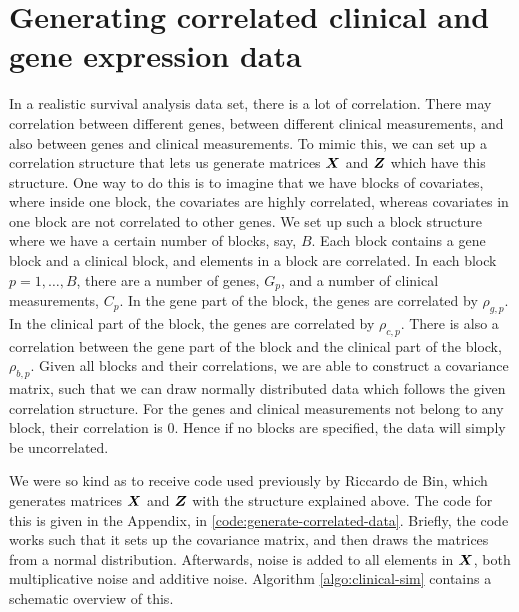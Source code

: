 \section{Generating correlated clinical and gene expression data}
\label{sec:generating-correlated-data}
In a realistic survival analysis data set, there is a lot of correlation.
There may correlation between different genes, between different clinical measurements, and also between genes and clinical measurements.
To mimic this, we can set up a correlation structure that lets us generate matrices $\bm{X}$ and $\bm{Z}$ which have this structure.
One way to do this is to imagine that we have blocks of covariates, where inside one block, the covariates are highly correlated, whereas covariates in one block are not correlated to other genes.
We set up such a block structure where we have a certain number of blocks, say, $B$.
Each block contains a gene block and a clinical block, and elements in a block are correlated.
In each block $p=1,\ldots,B$, there are a number of genes, $G_p$, and a number of clinical measurements, $C_p$.
In the gene part of the block, the genes are correlated by $\rho_{g,p}$.
In the clinical part of the block, the genes are correlated by $\rho_{c,p}$.
There is also a correlation between the gene part of the block and the clinical part of the block, $\rho_{b,p}$.
Given all blocks and their correlations, we are able to construct a covariance matrix, such that we can draw normally distributed data which follows the given correlation structure.
For the genes and clinical measurements not belong to any block, their correlation is 0.
Hence if no blocks are specified, the data will simply be uncorrelated.

We were so kind as to receive code used previously by Riccardo de Bin, which generates matrices $\bm{X}$ and $\bm{Z}$ with the structure explained above.
The code for this is given in the Appendix, in \ref{code:generate-correlated-data}.
Briefly, the code works such that it sets up the covariance matrix, and then draws the matrices from a normal distribution.
Afterwards, noise is added to all elements in $\bm{X}$, both multiplicative noise and additive noise.
Algorithm \ref{algo:clinical-sim} contains a schematic overview of this.

